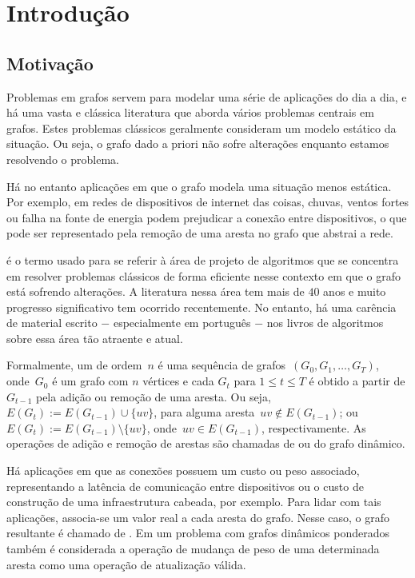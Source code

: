 \chapter{Introdução}

\section{Motivação}
\label{sec:Motivação}

Problemas em grafos servem para modelar uma série de aplicações do dia a dia,
e há uma vasta e clássica literatura que aborda vários problemas centrais em grafos.
Estes problemas clássicos geralmente consideram um modelo estático da situação. Ou seja, o grafo dado a priori não sofre alterações enquanto estamos resolvendo o problema.

Há no entanto aplicações em que o grafo modela uma situação menos estática. Por exemplo, em redes de dispositivos de internet das coisas, chuvas, ventos fortes ou falha na fonte de energia podem prejudicar a conexão entre dispositivos, o que pode ser representado pela remoção de uma aresta no grafo que abstrai a rede.

 é o termo usado para se referir à área de projeto de algoritmos que se concentra em resolver problemas clássicos de forma eficiente nesse contexto em que o grafo está sofrendo alterações. A literatura nessa área tem mais de $40$ anos e muito progresso significativo tem ocorrido recentemente. No entanto, há uma carência de material escrito $-$ especialmente em português $-$ nos livros de algoritmos sobre essa área tão atraente e atual.

Formalmente, um  de ordem~$n$ é uma sequência de grafos~$(G_0, G_1,\ldots, G_T)$, onde~$G_0$ é um grafo com $n$ vértices e
cada $G_t$ para $1\leq t\leq T$ é obtido a partir de $G_{t-1}$ pela adição ou remoção de uma aresta.
Ou seja,~$E(G_t) := E(G_{t-1})\cup \{uv\}$, para alguma aresta~$uv\notin E(G_{t-1})$;
ou $E(G_t) := E(G_{t-1})\setminus \{uv\}$, onde~$uv\in E(G_{t-1})$, respectivamente.
As operações de adição e remoção de arestas são chamadas de  ou  do grafo dinâmico.

Há aplicações em que as conexões possuem um custo ou peso associado,
representando a latência de comunicação entre dispositivos ou o custo de construção de uma infraestrutura cabeada, por exemplo. 
Para lidar com tais aplicações, associa-se um valor real a cada aresta do grafo.
Nesse caso, o grafo resultante é chamado de .
Em um problema com grafos dinâmicos ponderados também é considerada a operação
de mudança de peso de uma determinada aresta como uma operação de atualização válida.

